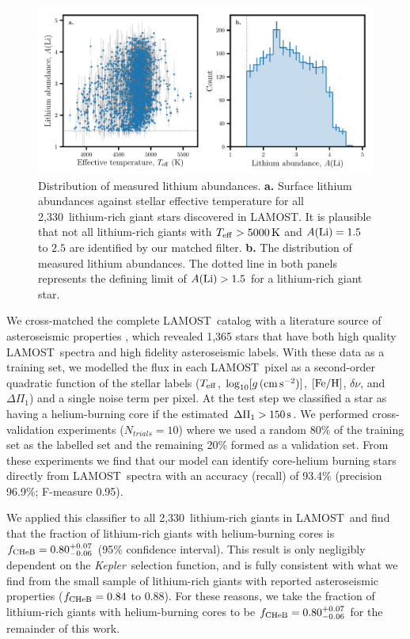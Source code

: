 \documentclass[twocolumn]{aastex62}
\newcommand{\SampleSize}{2,330}
\newcommand\lamost{LAMOST}
\newcommand{\project}[1]{\emph{#1}}
\newcommand{\kepler}{\project{Kepler}}
\newcommand{\logg}{\log_{10}[g\,({\rm cm\,s}^{-2})]}
\begin{document}
\begin{figure}[t]
    \includegraphics[width=\textwidth]{ref_li_distribution}
	\caption{Distribution of measured lithium abundances. \textbf{a.} Surface lithium abundances against stellar effective temperature for all \SampleSize\ lithium-rich giant stars discovered in \lamost. It is plausible that not all lithium-rich giants with $T_{\rm eff} > 5000\,{\rm K}$ and $A({\rm Li}) = 1.5$ to $2.5$ are identified by our matched filter. \textbf{b.} The distribution of measured lithium abundances.  The dotted line in both panels represents the defining limit of $A({\rm Li}) > 1.5$ for a lithium-rich giant star.}
    \label{fig:li_distribution}
\end{figure} 


We cross-matched the complete \lamost\ catalog with a literature source of asteroseismic
properties \citep[$\Delta\nu$, $\Delta\Pi_1$;][]{Vrard_2016}, which revealed 1,365 stars that 
have both high quality \lamost\ spectra and high fidelity asteroseismic labels. With these 
data as a training set, we modelled the flux in each \lamost\ pixel as a second-order quadratic function
of the stellar labels ($T_{\rm eff}$, $\logg$, $[{\rm Fe}/{\rm H}]$, $\delta\nu$, and $\Delta\Pi_1$)
and a single noise term per pixel. At the test step we classified a star as having a helium-burning core if 
the estimated $\Delta\Pi_1 > 150\,{\rm s}$. We performed cross-validation experiments ($N_{trials} = 10$) 
where we used a random 80\% of the training set as the labelled set and the remaining 20\% formed as a validation 
set. From these experiments we find that our model can identify core-helium burning stars directly
from \lamost\ spectra with an accuracy (recall) of 93.4\% (precision 96.9\%; F-measure 0.95). 

We applied this classifier to all \SampleSize\ lithium-rich giants in \lamost\ and find that the
fraction of lithium-rich giants with helium-burning cores is $f_{\rm CHeB} = 0.80^{+0.07}_{-0.06}$ 
(95\% confidence interval). This result is only negligibly dependent on the \kepler\ selection function, and is fully consistent with what we find from the small sample of lithium-rich giants 
with reported asteroseismic properties ($f_{\rm CHeB} = 0.84$ to $0.88$). For these reasons, 
we take the fraction of lithium-rich giants with helium-burning cores to be 
$f_{\rm CHeB} = 0.80^{+0.07}_{-0.06}$ for the remainder of this work.
\end{document}
